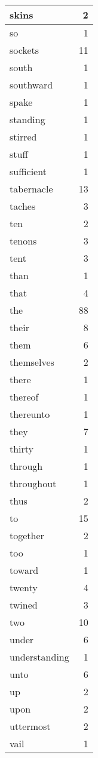 \begin{center}
\begin{longtable}{l|r}
skins & 2 \\ \hline
so & 1 \\ \hline
sockets & 11 \\ \hline
south & 1 \\ \hline
southward & 1 \\ \hline
spake & 1 \\ \hline
standing & 1 \\ \hline
stirred & 1 \\ \hline
stuff & 1 \\ \hline
sufficient & 1 \\ \hline
tabernacle & 13 \\ \hline
taches & 3 \\ \hline
ten & 2 \\ \hline
tenons & 3 \\ \hline
tent & 3 \\ \hline
than & 1 \\ \hline
that & 4 \\ \hline
the & 88 \\ \hline
their & 8 \\ \hline
them & 6 \\ \hline
themselves & 2 \\ \hline
there & 1 \\ \hline
thereof & 1 \\ \hline
thereunto & 1 \\ \hline
they & 7 \\ \hline
thirty & 1 \\ \hline
through & 1 \\ \hline
throughout & 1 \\ \hline
thus & 2 \\ \hline
to & 15 \\ \hline
together & 2 \\ \hline
too & 1 \\ \hline
toward & 1 \\ \hline
twenty & 4 \\ \hline
twined & 3 \\ \hline
two & 10 \\ \hline
under & 6 \\ \hline
understanding & 1 \\ \hline
unto & 6 \\ \hline
up & 2 \\ \hline
upon & 2 \\ \hline
uttermost & 2 \\ \hline
vail & 1 \\ \hline

\end{longtable}
\end{center}
